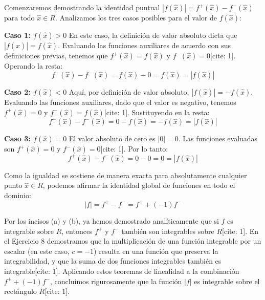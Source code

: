 \documentclass[11pt,letterpaper]{article}
\begin{document}
Comenzaremos demostrando la identidad puntual $|f(\hat{x})| = f^{+}(\hat{x}) - f^{-}(\hat{x})$ para todo $\hat{x} \in R$. Analizamos los tres casos posibles para el valor de $f(\hat{x})$:

\textbf{Caso 1: $f(\hat{x}) > 0$}
En este caso, la definición de valor absoluto dicta que $|f(\hat{x})| = f(\hat{x})$. Evaluando las funciones auxiliares de acuerdo con sus definiciones previas, tenemos que $f^{+}(\hat{x}) = f(\hat{x})$ y $f^{-}(\hat{x}) = 0$[cite: 1]. Operando la resta:
\begin{equation*}
f^{+}(\hat{x}) - f^{-}(\hat{x}) = f(\hat{x}) - 0 = f(\hat{x}) = |f(\hat{x})|
\end{equation*}

\textbf{Caso 2: $f(\hat{x}) < 0$}
Aquí, por definición de valor absoluto, $|f(\hat{x})| = -f(\hat{x})$. Evaluando las funciones auxiliares, dado que el valor es negativo, tenemos $f^{+}(\hat{x}) = 0$ y $f^{-}(\hat{x}) = f(\hat{x})$[cite: 1]. Sustituyendo en la resta:
\begin{equation*}
f^{+}(\hat{x}) - f^{-}(\hat{x}) = 0 - f(\hat{x}) = -f(\hat{x}) = |f(\hat{x})|
\end{equation*}

\textbf{Caso 3: $f(\hat{x}) = 0$}
El valor absoluto de cero es $|0| = 0$. Las funciones evaluadas son $f^{+}(\hat{x}) = 0$ y $f^{-}(\hat{x}) = 0$[cite: 1]. Por lo tanto:
\begin{equation*}
f^{+}(\hat{x}) - f^{-}(\hat{x}) = 0 - 0 = 0 = |f(\hat{x})|
\end{equation*}

Como la igualdad se sostiene de manera exacta para absolutamente cualquier punto $\hat{x} \in R$, podemos afirmar la identidad global de funciones en todo el dominio:
\begin{equation*}
|f| = f^{+} - f^{-} = f^{+} + (-1)f^{-}
\end{equation*}

Por los incisos (a) y (b), ya hemos demostrado analíticamente que si $f$ es integrable sobre $R$, entonces $f^{+}$ y $f^{-}$ también son integrables sobre $R$[cite: 1]. En el Ejercicio 8 demostramos que la multiplicación de una función integrable por un escalar (en este caso, $c = -1$) resulta en una función que preserva la integrabilidad, y que la suma de dos funciones integrables también es integrable[cite: 1]. 
Aplicando estos teoremas de linealidad a la combinación $f^{+} + (-1)f^{-}$, concluimos rigurosamente que la función $|f|$ es integrable sobre el rectángulo $R$[cite: 1].
\end{document}
